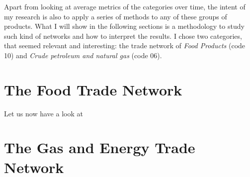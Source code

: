 Apart from looking at average metrics of the categories over time, the intent of my research is also to apply a series of methods to any of these groups of products. What I will show in the following sections is a methodology to study such kind of networks and how to interpret the results. I chose two categories, that seemed relevant and interesting: the trade network of \textit{Food Products} (code 10) and \textit{Crude petroleum and natural gas} (code 06). 
         

\section{The Food Trade Network}
Let us now have a look at 



\section{The Gas and Energy Trade Network}
